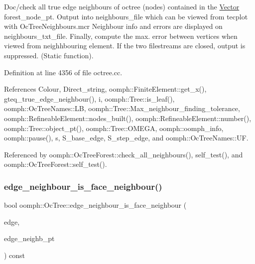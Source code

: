 Doc/check all true edge neighbours of octree (nodes) contained in the \hyperlink{classoomph_1_1Vector}{Vector} forest\+\_\+node\+\_\+pt. Output into neighbours\+\_\+file which can be viewed from tecplot with Oc\+Tree\+Neighbours.\+mcr Neighbour info and errors are displayed on neighbours\+\_\+txt\+\_\+file. Finally, compute the max. error between vertices when viewed from neighhbouring element. If the two filestreams are closed, output is suppressed. (Static function). 

Definition at line 4356 of file octree.\+cc.



References Colour, Direct\+\_\+string, oomph\+::\+Finite\+Element\+::get\+\_\+x(), gteq\+\_\+true\+\_\+edge\+\_\+neighbour(), i, oomph\+::\+Tree\+::is\+\_\+leaf(), oomph\+::\+Oc\+Tree\+Names\+::\+LB, oomph\+::\+Tree\+::\+Max\+\_\+neighbour\+\_\+finding\+\_\+tolerance, oomph\+::\+Refineable\+Element\+::nodes\+\_\+built(), oomph\+::\+Refineable\+Element\+::number(), oomph\+::\+Tree\+::object\+\_\+pt(), oomph\+::\+Tree\+::\+O\+M\+E\+GA, oomph\+::oomph\+\_\+info, oomph\+::pause(), s, S\+\_\+base\+\_\+edge, S\+\_\+step\+\_\+edge, and oomph\+::\+Oc\+Tree\+Names\+::\+UF.



Referenced by oomph\+::\+Oc\+Tree\+Forest\+::check\+\_\+all\+\_\+neighbours(), self\+\_\+test(), and oomph\+::\+Oc\+Tree\+Forest\+::self\+\_\+test().

\mbox{\label{classoomph_1_1OcTree_ab780bf82a61230f23bc3d96774a63010}} 
\subsubsection{\texorpdfstring{edge\+\_\+neighbour\+\_\+is\+\_\+face\+\_\+neighbour()}{edge\_neighbour\_is\_face\_neighbour()}}
{\footnotesize\ttfamily bool oomph\+::\+Oc\+Tree\+::edge\+\_\+neighbour\+\_\+is\+\_\+face\+\_\+neighbour (\begin{DoxyParamCaption}\item[{const int \&}]{edge,  }\item[{\hyperlink{classoomph_1_1OcTree}{Oc\+Tree} $\ast$}]{edge\+\_\+neighb\+\_\+pt }\end{DoxyParamCaption}) const\hspace{0.3cm}{\ttfamily [private]}}



